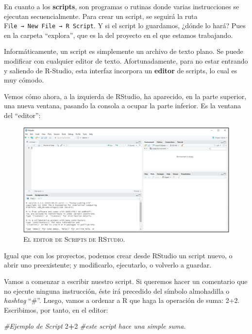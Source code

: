 \documentclass[
]{book}
\newenvironment{Shaded}{\begin{snugshade}}{\end{snugshade}}
\newcommand{\CommentTok}[1]{\textcolor[rgb]{0.56,0.35,0.01}{\textit{#1}}}
\newcommand{\DecValTok}[1]{\textcolor[rgb]{0.00,0.00,0.81}{#1}}
\newcommand{\SpecialCharTok}[1]{\textcolor[rgb]{0.81,0.36,0.00}{\textbf{#1}}}
\let\Oldincludegraphics\includegraphics
\renewcommand{\includegraphics}[2][]{%
  \Oldincludegraphics[#1]{#2}%
}
\begin{document}
En cuanto a los \textbf{scripts}, son programas o rutinas donde varias instrucciones se ejecutan secuencialmente. Para crear un script, se seguirá la ruta Fi\texttt{le\ →\ New\ File\ →\ R\ Script}. Y si el script lo guardamos, ¿dónde lo hará? Pues en la carpeta ``explora'', que es la del proyecto en el que estamos trabajando.

Informáticamente, un script es simplemente un archivo de texto plano. Se puede modificar con cualquier editor de texto. Afortunadamente, para no estar entrando y saliendo de R-Studio, esta interfaz incorpora un \textbf{editor} de scripts, lo cual es muy cómodo.

Vemos cómo ahora, a la izquierda de RStudio, ha aparecido, en la parte superior, una nueva ventana, pasando la consola a ocupar la parte inferior. Es la ventana del ``editor'':

\begin{figure}
\centering
\includegraphics[width=5.20833in,height=\textheight]{figuras/Imagen1_02.png}
\caption{\textsc{El editor de Scripts de RStudio.}}
\end{figure}

Igual que con los proyectos, podemos crear desde RStudio un script nuevo, o abrir uno preexistente; y modificarlo, ejecutarlo, o volverlo a guardar.

Vamos a comenzar a escribir nuestro script. Si queremos hacer un comentario que no ejecute ninguna instrucción, éste irá precedido del símbolo almohadilla o \emph{hashtag} ``\#''. Luego, vamos a ordenar a R que haga la operación de suma: 2+2. Escribimos, por tanto, en el editor:

\begin{Shaded}
\begin{Highlighting}[]
\CommentTok{\#Ejemplo de Script}
\DecValTok{2}\SpecialCharTok{+}\DecValTok{2}  \CommentTok{\#este script hace una simple suma.}
\end{Highlighting}
\end{Shaded}
\end{document}
